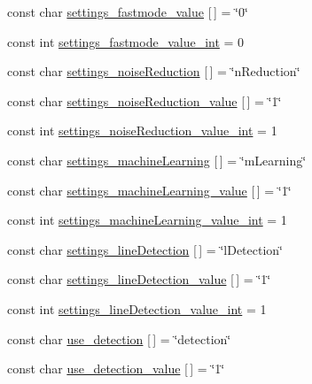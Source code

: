 \begin{DoxyCompactItemize}
const char \mbox{\hyperlink{namespaceyenot_a860366d2b9aa9cf0d9cdcaf58528c101}{settings\+\_\+fastmode\+\_\+value}} \mbox{[}$\,$\mbox{]} = \char`\"{}0\char`\"{}
\item 
const int \mbox{\hyperlink{namespaceyenot_aee49fb849c0951972cdac7466599314a}{settings\+\_\+fastmode\+\_\+value\+\_\+int}} = 0
\item 
const char \mbox{\hyperlink{namespaceyenot_a50716fcb731614c596c51676324c11e5}{settings\+\_\+noise\+Reduction}} \mbox{[}$\,$\mbox{]} = \char`\"{}n\+Reduction\char`\"{}
\item 
const char \mbox{\hyperlink{namespaceyenot_ae03e5eafa7f7253bce5126abe8575bfd}{settings\+\_\+noise\+Reduction\+\_\+value}} \mbox{[}$\,$\mbox{]} = \char`\"{}1\char`\"{}
\item 
const int \mbox{\hyperlink{namespaceyenot_aa228b5315065090d02dadbf128ba3d33}{settings\+\_\+noise\+Reduction\+\_\+value\+\_\+int}} = 1
\item 
const char \mbox{\hyperlink{namespaceyenot_a9e0a7decaab1ac67fda9bba816d240ad}{settings\+\_\+machine\+Learning}} \mbox{[}$\,$\mbox{]} = \char`\"{}m\+Learning\char`\"{}
\item 
const char \mbox{\hyperlink{namespaceyenot_ac24f2700516e72d7abda843c90ea197d}{settings\+\_\+machine\+Learning\+\_\+value}} \mbox{[}$\,$\mbox{]} = \char`\"{}1\char`\"{}
\item 
const int \mbox{\hyperlink{namespaceyenot_a14d42f7507a42b87ff62a9dc822c0af8}{settings\+\_\+machine\+Learning\+\_\+value\+\_\+int}} = 1
\item 
const char \mbox{\hyperlink{namespaceyenot_a49dc5e175f5b81894abe218db8949a89}{settings\+\_\+line\+Detection}} \mbox{[}$\,$\mbox{]} = \char`\"{}l\+Detection\char`\"{}
\item 
const char \mbox{\hyperlink{namespaceyenot_a300cc5d9afdbc58876cf3b52a2d9f055}{settings\+\_\+line\+Detection\+\_\+value}} \mbox{[}$\,$\mbox{]} = \char`\"{}1\char`\"{}
\item 
const int \mbox{\hyperlink{namespaceyenot_ae8c5d5792720627ea225afb6ee387915}{settings\+\_\+line\+Detection\+\_\+value\+\_\+int}} = 1
\item 
const char \mbox{\hyperlink{namespaceyenot_a17fec4b53b47f434f720ad8e804e3497}{use\+\_\+detection}} \mbox{[}$\,$\mbox{]} = \char`\"{}detection\char`\"{}
\item 
const char \mbox{\hyperlink{namespaceyenot_affbdf7e1315bdd3e0c9f7bb5d1b0a9b1}{use\+\_\+detection\+\_\+value}} \mbox{[}$\,$\mbox{]} = \char`\"{}1\char`\"{}
\item 

\end{DoxyCompactItemize}
